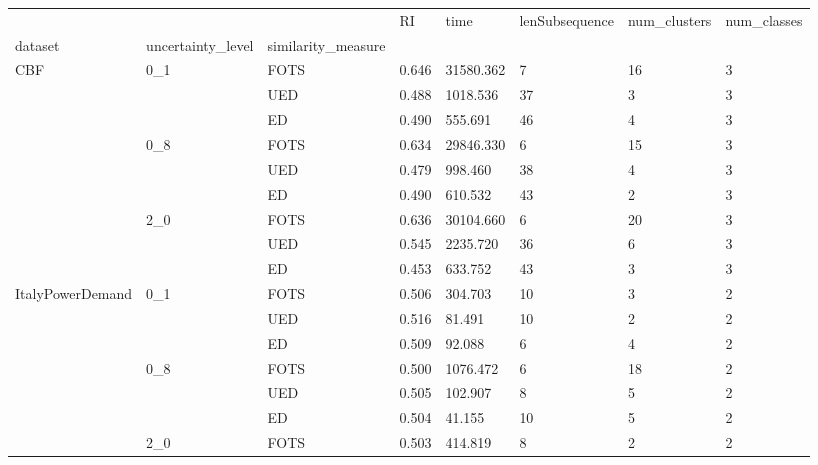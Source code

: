 \begin{tabular}{llllllll}
\toprule
           &     &    &    RI &      time & lenSubsequence & num\_clusters & num\_classes \\
dataset & uncertainty\_level & similarity\_measure &       &           &                &              &             \\
\midrule
\multirow{9}{*}{CBF} & \multirow{3}{*}{0\_1} & FOTS & 0.646 & 31580.362 &              7 &           16 &           3 \\
           &     & UED & 0.488 &  1018.536 &             37 &            3 &           3 \\
           &     & ED & 0.490 &   555.691 &             46 &            4 &           3 \\
\cline{2-8}
           & \multirow{3}{*}{0\_8} & FOTS & 0.634 & 29846.330 &              6 &           15 &           3 \\
           &     & UED & 0.479 &   998.460 &             38 &            4 &           3 \\
           &     & ED & 0.490 &   610.532 &             43 &            2 &           3 \\
\cline{2-8}
           & \multirow{3}{*}{2\_0} & FOTS & 0.636 & 30104.660 &              6 &           20 &           3 \\
           &     & UED & 0.545 &  2235.720 &             36 &            6 &           3 \\
           &     & ED & 0.453 &   633.752 &             43 &            3 &           3 \\
\cline{1-8}
\cline{2-8}
\multirow{9}{*}{ItalyPowerDemand} & \multirow{3}{*}{0\_1} & FOTS & 0.506 &   304.703 &             10 &            3 &           2 \\
           &     & UED & 0.516 &    81.491 &             10 &            2 &           2 \\
           &     & ED & 0.509 &    92.088 &              6 &            4 &           2 \\
\cline{2-8}
           & \multirow{3}{*}{0\_8} & FOTS & 0.500 &  1076.472 &              6 &           18 &           2 \\
           &     & UED & 0.505 &   102.907 &              8 &            5 &           2 \\
           &     & ED & 0.504 &    41.155 &             10 &            5 &           2 \\
\cline{2-8}
           & \multirow{3}{*}{2\_0} & FOTS & 0.503 &   414.819 &              8 &            2 &           2 \\

\end{tabular}
